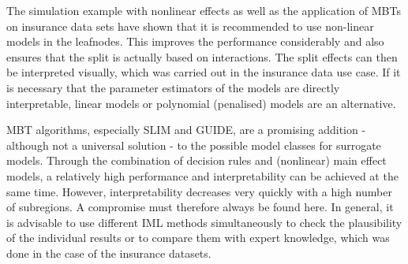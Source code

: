The simulation example with nonlinear effects as well as the application of MBTs on insurance data sets have shown that it is recommended to use non-linear models in the leafnodes. This improves the performance considerably and also ensures that the split is actually based on interactions.
The split effects can then be interpreted visually, which was carried out in the insurance data use case.
If it is necessary that the parameter estimators of the models are directly interpretable, linear models or polynomial (penalised) models are an alternative.


MBT algorithms, especially SLIM and GUIDE, are a promising addition - although not a universal solution - to the possible model classes for surrogate models. Through the combination of decision rules and (nonlinear) main effect models, a relatively high performance and interpretability can be achieved at the same time. However, interpretability decreases very quickly with a high number of subregions. A compromise must therefore always be found here. In general, it is advisable to use different IML methods simultaneously to check the plausibility of the individual results or to compare them with expert knowledge, which was done in the case of the insurance datasets.

